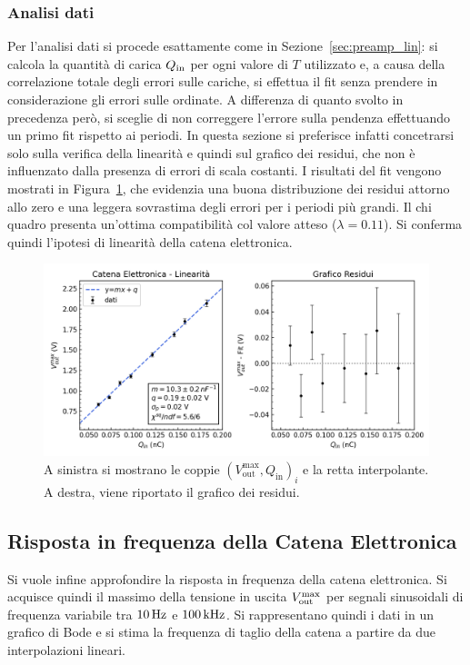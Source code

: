 \subsubsection{Analisi dati }\label{sec:catena_lin_analisi}
Per l'analisi dati si procede esattamente come in Sezione~\ref{sec:preamp_lin}: si calcola la
quantità di carica $Q_{\text{in}}$ per ogni valore di $T$ utilizzato e, a causa
della correlazione totale degli errori sulle cariche, si effettua il fit senza prendere in considerazione gli errori sulle ordinate. A differenza di
quanto svolto in precedenza però, si sceglie di non correggere l'errore sulla pendenza effettuando un primo fit rispetto ai periodi. In questa sezione si preferisce infatti concetrarsi solo sulla verifica della linearità e quindi
sul grafico dei residui, che non è influenzato dalla presenza di errori di
scala costanti. I risultati del fit vengono mostrati in Figura~\ref{fig:catena_fit_lin}, che evidenzia una buona distribuzione dei residui attorno allo zero e una leggera
sovrastima degli errori per i periodi più grandi. Il chi quadro presenta un'ottima
compatibilità col valore atteso ($\lambda=0.11$). Si conferma quindi l'ipotesi di linearità
della catena elettronica.
\begin{figure}[h]
\centering
\includegraphics[width=1\textwidth]{../ampli/images/fit_lin}
\caption{\footnotesize A sinistra si mostrano le coppie $(V_{\text{out}}^{\text{max}}, Q_{\text{in}})_{i}$ e la retta interpolante. A destra, viene riportato il grafico dei residui.}\label{fig:catena_fit_lin}
\end{figure}

\subsection{Risposta in frequenza della Catena Elettronica}\label{sec:catena_bode}
Si vuole infine approfondire la risposta in frequenza della catena elettronica. Si acquisce quindi il massimo della tensione in uscita $V_{\text{out}}^{\text{max}}$
per segnali sinusoidali di frequenza variabile tra $10 \Hz$ e $100\kHz$. Si rappresentano quindi i dati in un grafico di Bode e si stima la frequenza di taglio della catena a partire da due interpolazioni lineari.

